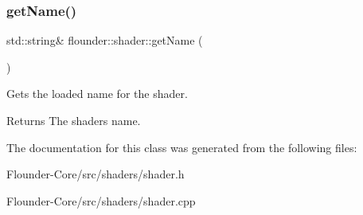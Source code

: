 \subsubsection{\texorpdfstring{get\+Name()}{getName()}}
{\footnotesize\ttfamily std\+::string\& flounder\+::shader\+::get\+Name (\begin{DoxyParamCaption}{ }\end{DoxyParamCaption})\hspace{0.3cm}{\ttfamily [inline]}}



Gets the loaded name for the shader. 

\begin{DoxyReturn}{Returns}
The shaders name. 
\end{DoxyReturn}


The documentation for this class was generated from the following files\+:\begin{DoxyCompactItemize}
\item 
Flounder-\/\+Core/src/shaders/shader.\+h\item 
Flounder-\/\+Core/src/shaders/shader.\+cpp\end{DoxyCompactItemize}
